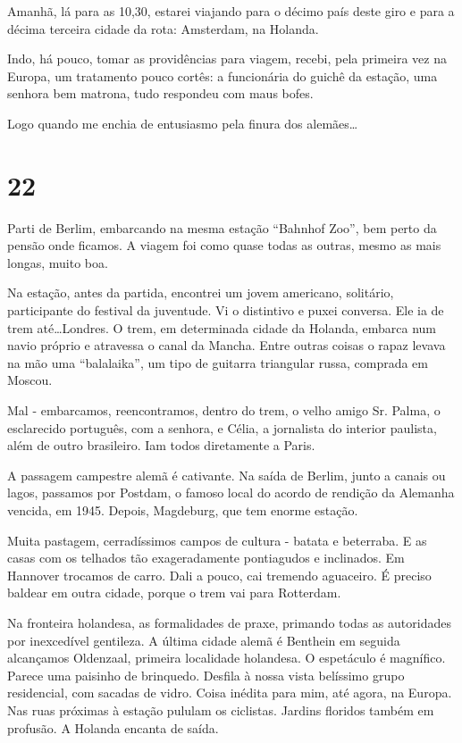 Amanhã, lá para as 10,30, estarei viajando para o décimo país deste giro e para a décima terceira cidade da rota: Amsterdam, na Holanda.

Indo, há pouco, tomar as providências para viagem, recebi, pela primeira vez na Europa, um tratamento pouco cortês: a funcionária do guichê da estação, uma senhora bem matrona, tudo respondeu com maus bofes.

Logo quando me enchia de entusiasmo pela finura dos alemães\ldots

\section*{22 \adfflatleafright {}}
Parti de Berlim, embarcando na mesma estação “Bahnhof Zoo”, bem perto da pensão onde ficamos. A viagem foi como quase todas as outras, mesmo as mais longas, muito boa.

Na estação, antes da partida, encontrei um jovem americano, solitário, participante do festival da juventude. Vi o distintivo e puxei conversa. Ele ia de trem até\ldots Londres. O trem, em determinada cidade da Holanda, embarca num navio próprio e atravessa o canal da Mancha. Entre outras coisas o rapaz levava na mão uma “balalaika”, um tipo de guitarra triangular russa, comprada em Moscou.

Mal - embarcamos, reencontramos, dentro do trem, o velho amigo Sr. Palma, o esclarecido português, com a senhora, e Célia, a jornalista do interior paulista, além de outro brasileiro. Iam todos diretamente a Paris.

A passagem campestre alemã é cativante. Na saída de Berlim, junto a canais ou lagos, passamos por Postdam, o famoso local do acordo de rendição da Alemanha vencida, em 1945. Depois, Magdeburg, que tem enorme estação.

Muita pastagem, cerradíssimos campos de cultura - batata e beterraba. E as casas com os telhados tão exageradamente pontiagudos e inclinados. Em Hannover trocamos de carro. Dali a pouco, cai tremendo aguaceiro. É preciso baldear em outra cidade, porque o trem vai para Rotterdam.

Na fronteira holandesa, as formalidades de praxe, primando todas as autoridades por inexcedível gentileza. A última cidade alemã é Benthein em seguida alcançamos Oldenzaal, primeira localidade holandesa. O espetáculo é magnífico. Parece uma paisinho de brinquedo. Desfila à nossa vista belíssimo grupo residencial, com sacadas de vidro. Coisa inédita para mim, até agora, na Europa. Nas ruas próximas à estação pululam os ciclistas. Jardins floridos também em profusão. A Holanda encanta de saída.

